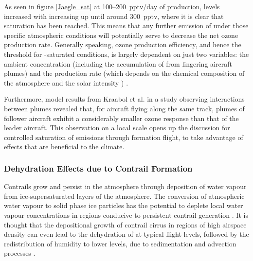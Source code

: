 As seen in figure \ref{Jaegle_sat} at 100--200~pptv/day of  production,  levels increased with increasing  up until around 300~pptv, where it is clear that  saturation has been reached. This means that any further emission of  under those specific atmospheric conditions will potentially serve to decrease the net ozone production rate. Generally speaking, ozone production efficiency, and hence the threshold for -saturated conditions, is largely dependent on just two variables: the ambient  concentration (including the accumulation of  from lingering aircraft plumes) and the  production rate (which depends on the chemical composition of the atmosphere and the solar intensity \cite{Monks2005}) \cite{Jaegle2001}. 

Furthermore, model results from Kraabol et al. \cite{Kraabol2000b} in a study observing interactions between plumes revealed that, for aircraft flying along the same track, plumes of follower aircraft exhibit a considerably smaller ozone response than that of the leader aircraft. This observation on a local scale opens up the discussion for controlled saturation of emissions through formation flight, to take advantage of effects that are beneficial to the climate.

\subsubsection{Dehydration Effects due to Contrail Formation}
Contrails grow and persist in the atmosphere through deposition of water vapour from ice-supersaturated layers of the atmosphere. The conversion of atmospheric water vapour to solid phase ice particles has the potential to deplete local water vapour concentrations in regions conducive to persistent contrail generation \cite{Unterstrasser2010}. It is thought that the depositional growth of contrail cirrus in regions of high airspace density can even lead to the dehydration of  at typical flight levels, followed by the redistribution of humidity to lower levels, due to sedimentation and advection processes \cite{Schumann2015}. 

